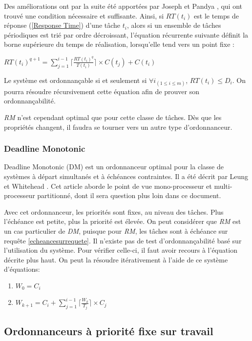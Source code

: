 	Des améliorations ont par la suite été apportées par Joseph et Pandya \cite{joseph_finding_1986},
	qui ont trouvé une condition nécessaire et suffisante. 
	Ainsi, si $RT(t_i)$ est le temps de réponse (\ref{Response Time}) d'une tâche $t_i$, 
	alors si un ensemble de tâches périodiques est trié par ordre décroissant, l'équation 
	récurrente suivante 
	définit la borne supérieure du temps de réalisation, lorsqu'elle tend vers un point fixe :
	\begin{center}
		$RT(t_i)^{q+1} = \sum_{j=1}^{i-1} \lceil \frac{RT(t_i)^q}{T(t_i)} \rceil \times C(t_j) + C(t_i)$
	\end{center}
	Le système est ordonnançable si et seulement si $\forall i_{(1 \leq i \leq m)}$, $RT(t_i) \leq D_i$.
	On pourra résoudre récursivement cette équation afin de prouver son ordonnançabilité.\medskip
	
	\textit{RM} n'est cependant optimal que pour cette classe de tâches. Dès que les propriétés changent, 
	il faudra se tourner vers un autre type d'ordonnanceur.
	
	
	\subsubsection{Deadline Monotonic}
	Deadline Monotonic (DM) est un ordonnanceur optimal pour la classe de systèmes à départ 
	simultanés et à échéances contraintes. 
	Il a été décrit par Leung et Whitehead 
	\cite{leung_complexity_1982}. Cet article aborde le point de vue mono-processeur et multi-processeur partitionné, 
	dont il sera question plus loin dans ce document.\medskip
	
	Avec cet ordonnanceur, les priorités sont fixes, au niveau des tâches.
	Plus l'échéance est petite, plus la priorité est élevée. On peut considérer que \textit{RM} est 
	un cas particulier de \textit{DM}, puisque pour \textit{RM}, les tâches sont à échéance sur requête \ref{echeancesurrequete}.
	Il n'existe pas de test d'ordonnançabilité basé sur l'utilisation du système. Pour vérifier celle-ci, 
	il faut avoir recours à l'équation décrite plus haut. 
	On peut la résoudre itérativement à l'aide de ce système d'équations: \medskip
	\begin{enumerate}
		\item $W_0 = C_i $
		\item $W_{k+1} = C_i + \sum_{j = 1}^{i-1}\lceil \frac{W_k}{T_j} \rceil \times C_j $
	\end{enumerate}
	
	
	\subsection{Ordonnanceurs à priorité fixe sur travail}
